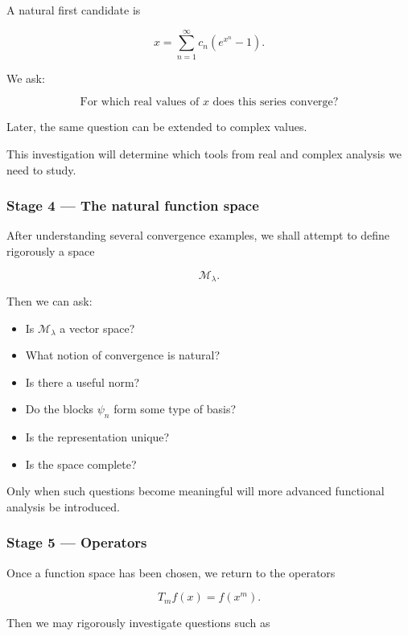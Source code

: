 A natural first candidate is

\[
x
=
\sum_{n=1}^{\infty}
c_n(e^{x^n}-1).
\]

We ask:

\[
\boxed{
\text{For which real values of }x
\text{ does this series converge?}
}
\]

Later, the same question can be extended to complex values.

This investigation will determine which tools from real and complex
analysis we need to study.

\subsubsection*{Stage 4 --- The natural function space}

After understanding several convergence examples, we shall attempt to
define rigorously a space

\[
\mathcal{M}_{\lambda}.
\]

Then we can ask:

\begin{itemize}

    \item Is \(\mathcal{M}_{\lambda}\) a vector space?

    \item What notion of convergence is natural?

    \item Is there a useful norm?

    \item Do the blocks \(\psi_n\) form some type of basis?

    \item Is the representation unique?

    \item Is the space complete?

\end{itemize}

Only when such questions become meaningful will more advanced functional
analysis be introduced.

\subsubsection*{Stage 5 --- Operators}

Once a function space has been chosen, we return to the operators

\[
T_mf(x)=f(x^m).
\]

Then we may rigorously investigate questions such as

